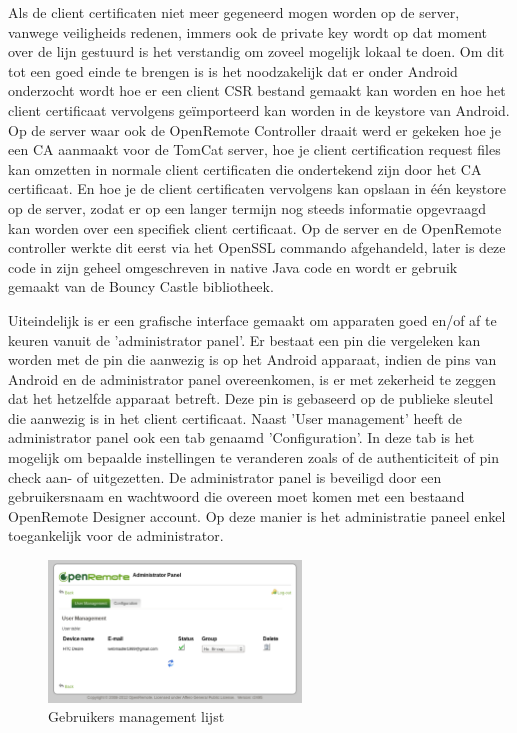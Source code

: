 \documentclass[]{article}
\begin{document}
Als de client certificaten niet meer gegeneerd mogen worden op de server,
vanwege veiligheids redenen, immers ook de private key wordt op dat moment over
de lijn gestuurd is het verstandig om zoveel mogelijk lokaal te doen. Om dit
tot een goed einde te brengen is is het noodzakelijk
dat er onder Android onderzocht wordt hoe er een client CSR bestand gemaakt kan
worden en hoe het client certificaat vervolgens geïmporteerd kan worden in de
keystore van Android. Op de server waar ook de OpenRemote Controller draait werd
er gekeken hoe je een CA aanmaakt voor de TomCat server, hoe je client
certification request files kan omzetten in normale client certificaten die
ondertekend zijn door het CA certificaat. En hoe je de client certificaten
vervolgens kan opslaan in één keystore op de server, zodat er op een langer
termijn nog steeds informatie opgevraagd kan worden over een specifiek client certificaat.
Op de server en de OpenRemote controller werkte dit eerst via het OpenSSL
commando afgehandeld, later is deze code in zijn geheel omgeschreven in native Java code en
wordt er gebruik gemaakt van de Bouncy Castle bibliotheek.

Uiteindelijk is er een grafische interface gemaakt om apparaten goed en/of af te
keuren vanuit de 'administrator panel'. Er bestaat een pin die vergeleken kan
worden met de pin die aanwezig is op het Android apparaat, indien de pins van
Android en de administrator panel overeenkomen, is er met zekerheid te zeggen
dat het hetzelfde apparaat betreft. Deze pin is gebaseerd op de publieke
sleutel die aanwezig is in het client certificaat. Naast 'User management' heeft de
administrator panel ook een tab genaamd 'Configuration'. In deze tab is het
mogelijk om bepaalde instellingen te veranderen zoals of de authenticiteit of
pin check aan- of uitgezetten.  De administrator panel is beveiligd door een
gebruikersnaam en wachtwoord die overeen moet komen met een bestaand OpenRemote
Designer account. Op deze manier is het administratie paneel enkel toegankelijk
voor de administrator.

\begin{figure}[htpb]
   \begin{center}
     \includegraphics[width=0.6\textwidth]{userlist.pdf}
   \end{center}
   \caption{Gebruikers management lijst}
\end{figure}
\end{document}
